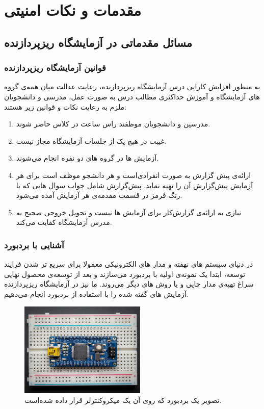 \chapter{مقدمات و نکات امنیتی}
\section{مسائل مقدماتی در آزمایشگاه ریزپردازنده}

\subsection{قوانین آزمایشگاه ریزپردازنده}
به منظور افزایش کارایی درس آزمایشگاه ریزپردازنده، رعایت عدالت میان همه‌ی گروه های آزمایشگاه و آموزش حداکثری مطالب درس به صورت عمل، مدرسی و دانشجویان ملزم به رعایت نکات و قوانین زیر هستند:
\begin{enumerate}
    \item مدرسین و دانشجویان موظفند راس ساعت در کلاس حاضر شوند.
    \item غیبت در هیچ یک از جلسات آزمایشگاه مجاز نیست.
    \item آزمایش ها در گروه های دو نفره انجام می‌شوند.
    \item ارائه‌ی پیش گزارش به صورت انفرادی‌است و هر دانشجو موظف است برای هر آزمایش پیش‌گزارش آن را تهیه نماید. پیش‌گزارش شامل جواب سوال هایی که با رنگ قرمز در قسمت مقدمه‌ی هر آزمایش آمده می‌شود.
    \item نیازی به ارائه‌ی گزارش‌کار برای آزمایش ها نیست و تحویل خروجی صحیح به مدرس آزمایشگاه کفایت می‌کند.
\end{enumerate}

\subsection{آشنایی با بردبورد}

در دنیای سیستم های نهفته و مدار های الکترونیکی معمولا برای سریع تر شدن فرایند توسعه، ابتدا یک نمونه‌ی اولیه با بردبورد می‌سازند و بعد از توسعه‌ی محصول نهایی سراغ تهیه‌ی مدار چاپی و یا روش های دیگر می‌روند. ما نیز در آزمایشگاه ریزپردازنده آزمایش های گفته شده را با استفاده از بردبورد انجام می‌دهیم.
\begin{figure}[h]
    \centering
    \includegraphics[width=6cm]{breadboard.png}
    \caption{تصویر یک بردبورد که روی آن یک میکروکنترلر قرار داده شده‌است.}
    \label{fig:breadboard}
\end{figure}

